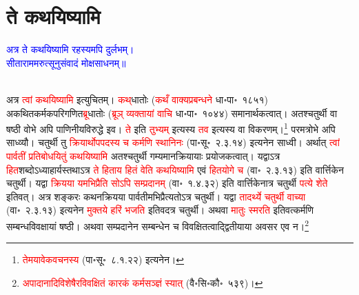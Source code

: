 \section[ते कथयिष्यामि]{ते कथयिष्यामि}
\centering\textcolor{blue}{अत्र ते कथयिष्यामि रहस्यमपि दुर्लभम्।\nopagebreak\\
सीताराममरुत्सूनुसंवादं मोक्षसाधनम्॥}\nopagebreak\\
\\
\begin{sloppypar}\justifying\noindent\hspace{10mm} अत्र \textcolor{red}{त्वां कथयिष्यामि} इत्युचितम्। \textcolor{red}{कथ्‌}\-धातोः (\textcolor{red}{कथँ वाक्य\-प्रबन्धने} धा॰पा॰~१८५१) अकथित\-कर्मक\-परिगणित\-\textcolor{red}{ब्रू}\-धातोः (\textcolor{red}{ब्रूञ् व्यक्तायां वाचि} धा॰पा॰~१०४४) समानार्थकत्वात्। अतश्चतुर्थी वा षष्ठी वोभे अपि पाणिनीय\-विरुद्धे इव। \textcolor{red}{ते} इति \textcolor{red}{तुभ्यम्‌} इत्यस्य \textcolor{red}{तव} इत्यस्य वा विकरणम्।\footnote{\textcolor{red}{तेमयावेकवचनस्य} (पा॰सू॰~८.१.२२) इत्यनेन।} परमत्रोभे अपि साध्व्यौ। चतुर्थी तु \textcolor{red}{क्रियार्थोपपदस्य च कर्मणि स्थानिनः} (पा॰सू॰~२.३.१४) इत्यनेन साध्वी। अर्थात् \textcolor{red}{त्वां पार्वतीं प्रतिबोधयितुं कथयिष्यामि} अतश्चतुर्थी गम्यमान\-क्रियायाः प्रयोजकत्वात्। यद्वाऽत्र \textcolor{red}{हित}\-शब्दोऽध्याहार्यस्तथाऽत्र \textcolor{red}{ते हिताय हितं वेति कथयिष्यामि} एवं \textcolor{red}{हित\-योगे च} (वा॰~२.३.१३) इति वार्त्तिकेन चतुर्थी। यद्वा
\textcolor{red}{क्रियया यमभिप्रैति सोऽपि सम्प्रदानम्‌} (वा॰~१.४.३२) इति वार्त्तिकेनात्र चतुर्थी \textcolor{red}{पत्ये शेते} इतिवत्। अत्र शङ्करः कथन\-क्रियया पार्वतीमभि\-प्रैत्यतोऽत्र चतुर्थी। यद्वा \textcolor{red}{तादर्थ्ये चतुर्थी वाच्या} (वा॰~२.३.१३) इत्यनेन \textcolor{red}{मुक्तये हरिं भजति} इतिवदत्र चतुर्थी। अथवा \textcolor{red}{मातुः स्मरति} इतिवत्कर्मणि सम्बन्ध\-विवक्षायां षष्ठी। अथवा सम्प्रदानेन सम्बन्धेन च विवक्षितत्वाद्द्वितीयाया अवसर एव न।\footnote{\textcolor{red}{अपादानादि\-विशेषैरविवक्षितं कारकं कर्मसञ्ज्ञं स्यात्‌} (वै॰सि॰कौ॰~५३९)।}\end{sloppypar}
